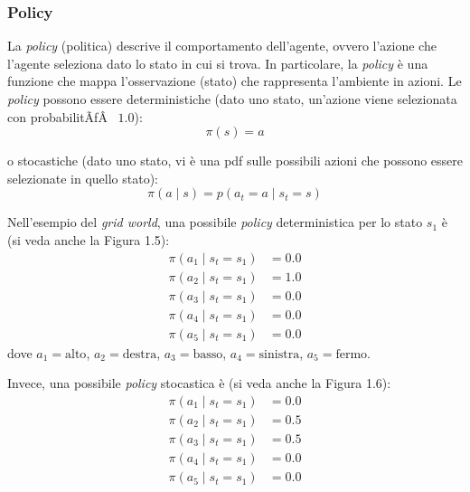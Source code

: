 ﻿\documentclass[11pt, a4paper]{report}
\begin{document}
\subsubsection{Policy}

La \emph{policy} (politica) descrive il comportamento dell'agente, ovvero l'azione che l'agente seleziona dato lo stato in cui si trova. In particolare, la \emph{policy} è una funzione che mappa l'osservazione (stato) che rappresenta l'ambiente in azioni. Le \emph{policy} possono essere deterministiche (dato uno stato, un'azione viene selezionata con probabilitÃƒÂ  $1.0$):
\begin{equation}
\pi(s) = a
\end{equation}

\newpage

o stocastiche (dato uno stato, vi è una pdf sulle possibili azioni che possono essere selezionate in quello stato):
\begin{equation}
\pi(a \mid s) = p(a_t = a \mid s_t = s)
\end{equation}

Nell'esempio del \emph{grid world}, una possibile \emph{policy} deterministica per lo stato $s_1$ è (si veda anche la Figura 1.5):
\begin{align}
\pi(a_1 \mid s_t = s_1) &= 0.0  \\
\pi(a_2 \mid s_t = s_1) &= 1.0  \\
\pi(a_3 \mid s_t = s_1) &= 0.0  \\
\pi(a_4 \mid s_t = s_1) &= 0.0  \\
\pi(a_5 \mid s_t = s_1) &= 0.0
\end{align}
dove $a_1 = \text{alto}$, $a_2 = \text{destra}$, $a_3 = \text{basso}$, $a_4 = \text{sinistra}$, $a_5 = \text{fermo}$.


\newpage

Invece, una possibile \emph{policy} stocastica è (si veda anche la Figura 1.6):
\begin{align}
\pi(a_1 \mid s_t = s_1) &= 0.0  \\
\pi(a_2 \mid s_t = s_1) &= 0.5  \\
\pi(a_3 \mid s_t = s_1) &= 0.5  \\
\pi(a_4 \mid s_t = s_1) &= 0.0  \\
\pi(a_5 \mid s_t = s_1) &= 0.0
\end{align}
\end{document}
